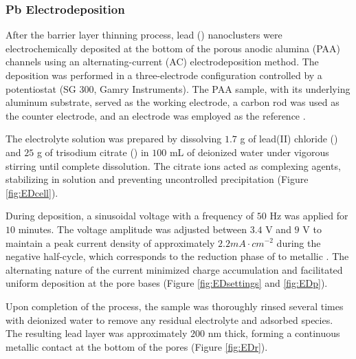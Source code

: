 \documentclass{rapportCS}
\begin{document}
	\subsubsection{Pb Electrodeposition}
	
	After the barrier layer thinning process, lead () nanoclusters were electrochemically deposited at the bottom of the porous anodic alumina (PAA) channels using an alternating-current (AC) electrodeposition method. The deposition was performed in a three-electrode configuration controlled by a potentiostat (SG 300, Gamry Instruments). The PAA sample, with its underlying aluminum substrate, served as the working electrode, a carbon rod was used as the counter electrode, and an  electrode was employed as the reference .
	
	The electrolyte solution was prepared by dissolving $1.7$ g of lead(II) chloride () and $25$ g of trisodium citrate () in $100$ mL of deionized water under vigorous stirring until complete dissolution. The citrate ions acted as complexing agents, stabilizing  in solution and preventing uncontrolled precipitation (Figure \ref{fig:EDcell}).
	
	During deposition, a sinusoidal voltage with a frequency of $50$ Hz was applied for $10$ minutes. The voltage amplitude was adjusted between $3.4$ V and $9$ V to maintain a peak current density of approximately $2.2 mA·cm^{-2}$ during the negative half-cycle, which corresponds to the reduction phase of  to metallic . The alternating nature of the current minimized charge accumulation and facilitated uniform deposition at the pore bases (Figure \ref{fig:EDsettings} and \ref{fig:EDp}).
	
	Upon completion of the process, the sample was thoroughly rinsed several times with deionized water to remove any residual electrolyte and adsorbed species. The resulting lead layer was approximately $200$ nm thick, forming a continuous metallic contact at the bottom of the pores (Figure \ref{fig:EDr}).
	
\end{document}
